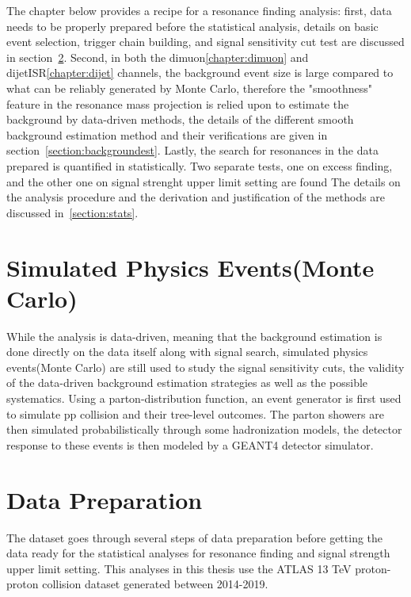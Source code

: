 The chapter below provides a recipe for a resonance finding analysis: first, data needs to be properly prepared before the statistical analysis, details on basic event selection, trigger chain building, and signal sensitivity cut test are discussed in section~\ref{section:dataprep}. Second, in both the dimuon\ref{chapter:dimuon} and dijetISR\ref{chapter:dijet} channels, the background event size is large compared to what can be reliably generated by Monte Carlo, therefore the "smoothness" feature in the resonance mass projection is relied upon to estimate the background by data-driven
methods, the details of the different smooth background estimation method and their verifications are given in section~\ref{section:backgroundest}. Lastly, the search for resonances in the data prepared is quantified in statistically. Two separate tests, one on excess finding, and the other one on signal strenght upper limit setting are found The details on the analysis procedure and the derivation and justification of the methods are discussed in~\ref{section:stats}. 

\section{Simulated Physics Events(Monte Carlo)}
While the analysis is data-driven, meaning that the background estimation is done directly on the data itself along with signal search, simulated physics events(Monte Carlo) are still used to study the signal sensitivity cuts, the validity of the data-driven background estimation strategies as well as the possible systematics.
Using a parton-distribution function, an event generator is first used to simulate pp collision and their tree-level outcomes. The parton showers are then simulated probabilistically through some hadronization models, the detector response to these events is then modeled by a GEANT4 detector simulator. 


\section{Data Preparation}
\label{section:dataprep}
The dataset goes through several steps of data preparation before getting the data ready for the statistical analyses for resonance finding and signal strength upper limit setting. This analyses in this thesis use the ATLAS 13 TeV proton-proton collision dataset generated between 2014-2019.

